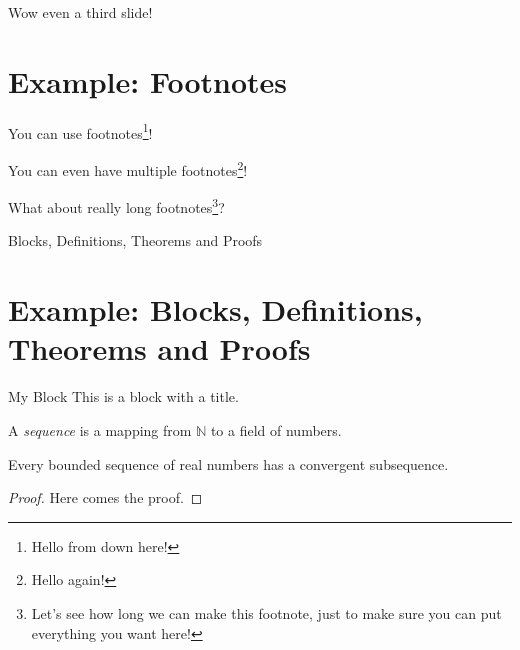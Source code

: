 \documentclass[17pt,institute=none]{tuhh_presentation}
\begin{document}
\begin{frame}{Wow even a third slide!}
    \section{Example: Footnotes}

    You can use footnotes\footnote{Hello from down here!}!

    You can even have multiple footnotes\footnote{Hello again!}!

    What about really long footnotes\footnote{Let's see how long we can make this footnote, just to make sure you can put everything you want here!}?
\end{frame}

\begin{frame}{Blocks, Definitions, Theorems and Proofs}
    \section{Example: Blocks, Definitions, Theorems and Proofs}

    \begin{block}{My Block}
      This is a block with a title.
    \end{block}

    \begin{definition}
      A \emph{sequence} is a mapping from $\mathbb{N}$ to a field of numbers.
    \end{definition}

    \begin{theorem}
      Every bounded sequence of real numbers has a convergent subsequence.
    \end{theorem}

    \begin{proof}
      Here comes the proof.
    \end{proof}
\end{frame}
\end{document}
